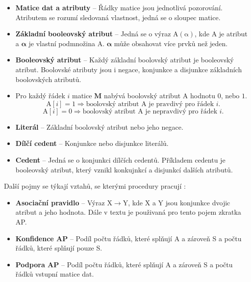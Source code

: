 \begin{itemize}
    \itemsep0em
    \item \textbf{Matice dat a atributy} -- Řádky matice jsou jednotlivá pozorování. Atributem se rozumí sledovaná vlastnost, jedná se o sloupec matice.
    \item \textbf{Základní booleovský atribut} -- Jedná se o výraz $\bm{\mathrm{A(\alpha)}}$, kde $\bm{\mathrm{A}}$ je atribut a  $\bm{\alpha}$ je vlastní podmnožina $\bm{\mathrm{A}}$. $\bm{\alpha}$ může obsahovat více prvků než jeden.
    \item \textbf{Booleovský atribut} -- Každý základní boolovský atribut je booleovský atribut. Boolovské atributy jsou i negace, konjunkce a disjunkce základních boolovských atributů. 
    \item[] Pro každý řádek $i$ matice $\mathbf{M}$ nabývá boolovský atribut  $\bm{\mathrm{A}}$ hodnotu $0$, nebo $1$.
    \begin{equation*}
    \bm{\mathrm{A}}\left[i\right] = 1 \Rightarrow \mbox{boolovský atribut } \bm{\mathrm{A}} \mbox{ je pravdivý pro řádek } i.
    \end{equation*}
    \begin{equation*}
        \bm{\mathrm{A}}\left[i\right] = 0 \Rightarrow \mbox{boolovský atribut } \bm{\mathrm{A}} \mbox{ je nepravdivý pro řádek } i.
        \end{equation*}

    \item \textbf{Literál} -- Základní boolovský atribut nebo jeho negace.
    \item \textbf{Dílčí cedent} -- Konjunkce nebo disjunkce literálů.
    \item \textbf{Cedent} -- Jedná se o konjunkci dílčích cedentů. Příkladem cedentu je booleovský atribut, který vznikl konkujnkcí a disjunkcí dalších atributů.

\end{itemize}


Další pojmy se týkají vztahů, se kterými procedury pracují \cite{bib:GUHA}:

\begin{itemize}
    \itemsep0em
    \item \textbf{Asociační pravidlo} -- Výraz $\mathrm{X} \rightarrow \mathrm{Y}$, kde $\mathrm{X}$ a $\mathrm{Y}$ jsou konjunkce dvojic atribut a jeho hodnota. Dále v textu je použivaná pro tento pojem zkratka AP.
    \item \textbf{Konfidence AP} -- Podíl počtu řádků, které splňují A a zároveň S a počtu řádků, které splňují pouze S.
    \item \textbf{Podpora AP} -- Podíl počtu řádků, které splňují A a zároveň S a počtu řádků vstupní matice dat.
\end{itemize}

